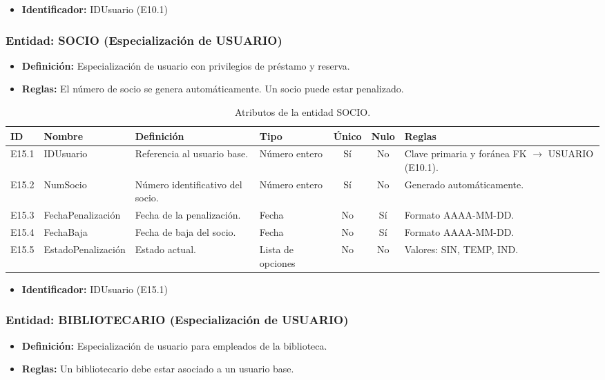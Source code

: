 	\begin{itemize}
		\item\textbf{Identificador:} IDUsuario (E10.1)
	\end{itemize}
	
	\subsubsection{Entidad: SOCIO (Especialización de USUARIO)}
	\begin{itemize}
		\item\textbf{Definición:} Especialización de usuario con privilegios de préstamo y reserva.
		\item\textbf{Reglas:} El número de socio se genera automáticamente. Un socio puede estar penalizado.
	\end{itemize}
	
	\begin{table}[H]
		\centering
		\caption{Atributos de la entidad SOCIO.}
		\label{tab:dict_socio}
		\small
		\begin{tabularx}{\textwidth}{l l X l c c X}
			\toprule
			\textbf{ID} & \textbf{Nombre} & \textbf{Definición} & \textbf{Tipo} & \textbf{Único} & \textbf{Nulo} & \textbf{Reglas} \\
			\midrule
			E15.1 & IDUsuario & Referencia al usuario base. & Número entero & Sí & No & Clave primaria y foránea FK $\rightarrow$ USUARIO (E10.1). \\
			\addlinespace
			E15.2 & NumSocio & Número identificativo del socio. & Número entero & Sí & No & Generado automáticamente. \\
			\addlinespace
			E15.3 & FechaPenalización & Fecha de la penalización. & Fecha & No & Sí & Formato AAAA-MM-DD. \\
			\addlinespace
			E15.4 & FechaBaja & Fecha de baja del socio. & Fecha & No & Sí & Formato AAAA-MM-DD. \\
			\addlinespace
			E15.5 & EstadoPenalización & Estado actual. & Lista de opciones & No & No & Valores: SIN, TEMP, IND. \\
			\bottomrule
		\end{tabularx}
	\end{table}
	
	\begin{itemize}
		\item\textbf{Identificador:} IDUsuario (E15.1)
	\end{itemize}
	
	\subsubsection{Entidad: BIBLIOTECARIO (Especialización de USUARIO)}
	\begin{itemize}
		\item\textbf{Definición:} Especialización de usuario para empleados de la biblioteca.
		\item\textbf{Reglas:} Un bibliotecario debe estar asociado a un usuario base.
	\end{itemize}
	
